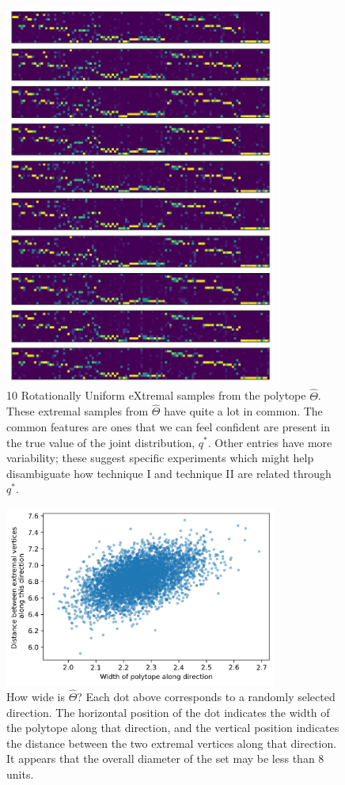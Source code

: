 \begin{figure}
\includegraphics[width=0.8\textwidth]{pics/allenRUX}
\caption{10 Rotationally Uniform eXtremal samples from the polytope $\hat \Theta$.  These extremal samples from $\hat \Theta$ have quite a lot in common.  The common features are ones that we can feel confident are present in the true value of the joint distribution, $q^*$.  Other entries have more variability; these suggest specific experiments which might help disambiguate how technique I and technique II are related through $q^*$.  \label{fig:allenRUX}}
\end{figure}

\begin{figure}
\includegraphics[width=0.8\textwidth]{pics/allenwidths}
\caption{How wide is $\hat \Theta$?  Each dot above corresponds to a randomly selected direction.  The horizontal position of the dot indicates the width of the polytope along that direction, and the vertical position indicates the distance between the two extremal vertices along that direction.  It appears that the overall diameter of the set may be less than 8 units.\label{fig:allenwidths}}
\end{figure}

